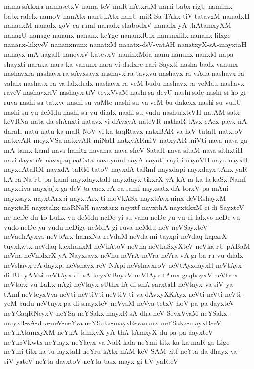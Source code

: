 {nama-sAkxra
namasetxV
nama-teV-maR-nAtxraM
nami-babx-rigU
namimx-babx-ralelx
namoV
nanAtx
nanUkAtx
nanU-miR-Sa-TAkx-tiV-tatavxM
nanadxH
nanadxM
nanadx-goV-ca-ramf
nanadx-shabodxV
nanadx-yA-thAtamxyXM
nanagU
nanage
nananx
nananx-keYge
nananxlUlx
nananxlilx
nananx-lilxge
nananx-lilxyeV
nananxnunx
nanatxM
nanatx-deV-vatAH
nanatxyX-sA-mayxtaH
nanayx-mA-nagaH
nanevxV-katevxV
naninxMda
nanu
nanunx
nanxM
napa-shayxti
naraka
nara-ka-vanunx
nara-vi-dadxre
nari-Sayxti
nasha-badx-vanunx
nashavxra
nashavx-ra-sAyxsayx
nashavx-ra-tavxvu
nashavx-ra-vAda
nashavx-ra-valalx
nashavx-ra-va-lalxdudx
nashavx-ra-veM-budu
nashavx-ra-veMdu
nashavx-raveV
nashavxriV
nashayx-tiV-teyxVvaM
nashi-sa-deyU
nashi-side
nashi-si-ho-gi-ruva
nashi-su-tatxve
nashi-su-vaMte
nashi-su-va-veM-bu-dakekx
nashi-su-vudU
nashi-su-vu-deMdu
nashi-su-vu-dilalx
nashi-su-vudu
nashurxteVH
natAM-satx-keVRNa
nata-da-shAnxti
natavx-vi-dAyxyA
nateVR
nathaR-tAvx-cAcx-payx-nA-daraH
natu
natu-ka-maR-NoV-vi-ka-taqRtavx
natxBAR-va-heV-tutaH
natxroV
natxyAR-meyxVSa
natxyAR-miNaH
natxyARmiV
natxyAR-miVti
nava
nava-ga-mA-tamx-kamf
nava-hanitx
navama
nava-sheV-SataH
nava-sitaM
nava-sithxtiH
navi-dayxteV
navxpaq-caCxta
navxyamf
nayA
nayati
nayisi
nayoVH
nayx
nayxH
nayxdAtaRM
nayxdA-taRM-tatoV
nayxdA-taRmf
nayxdapi
nayxdayx-tAkx-yaR-kA-ra-Na-rU-pa-kamf
nayxdayxtaH
nayxdayx-tikxrX-yA-kA-ra-ka-la-kaSx-Namf
nayxdiva
nayxjajx-ga-deV-ta-cacx-rA-ca-ramf
nayxsatx-dA-torxV-pa-mAni
nayxsayx
nayxtArxpi
nayxtArx-ti-moVkASx
nayxtAvx-ninx-deVRshayxM
nayxtaH
nayxtakx-maRNaH
nayxtarx
nayxtf
nayxthA
nayxtikxM-ci-di-SayxteV
ne
neDe-du-ko-LuLx-vu-deMdu
neDe-yi-su-vanu
neDe-yu-vu-di-lalxvo
neDe-yu-vudo
neDe-yu-vudu
neDige
neMdA-gi-ruva
neMdu
neV
neVSayxteV
neVadhAyxya
neVbArx-hamxNa
neVdaM
neVda-mi-tayxpi
neVdaq-kapxrX-tuyxkwtx
neVdaq-kicxhanxM
neVhAtoV
neVha
neVkaSxyXteV
neVka-rU-pABaM
neVna
neVnidxrX-yA-Nayxsayx
neVnu
neVrA
neVra
neVra-vA-gi-ba-ru-vu-dilalx
neVshavx-rA-dayxpi
neVshavx-reV-NApi
neVshavxroV
neVtAyxdayxH
neVtAyx-di-BU-yAMsi
neVtAyx-di-vA-keyxVBoyxV
neVtAyx-tAmx-gaqhoyxV
neVtarx
neVtarx-vu-LaLx-nAgi
neVtayx-sUthx-lA-di-shA-sarxtaH
neVtayx-va-siV-ya-tAmf
neVteyxVva
neVti
neVtiVti
neVtiV-ti-va-dAvxyXKAyx
neVti-neVti
neVti-yeM-budu
neVtuyx-pa-di-shayxteV
neVyaM
neVya-tetxV-hoV-pa-pa-dayxteV
neYGaqRNeyxV
neYSa
neYSakx-mayxR-sA-dha-neV-SevxVvaM
neYSakx-mayxR-sA-dha-neV-neYva
neYSakx-mayxR-vanunx
neYSakx-mayxRveV
neYkAtamxyXM
neYkA-tamxyX-yA-thA-tAmxyX-du-pa-pa-dayxteV
neYkoVkwtx
neYlayx
neYlayx-va-NaR-kala
neYmi-titx-ka-ka-maR-ga-Lige
neYmi-titx-ka-tu-layxtaH
neYru-kAtx-nAM-keV-SAM-citf
neYta-da-dhayx-va-siV-yateV
neYta-dayxtoV
neYta-tasx-mayx-gi-tiV-yaRteV
}
